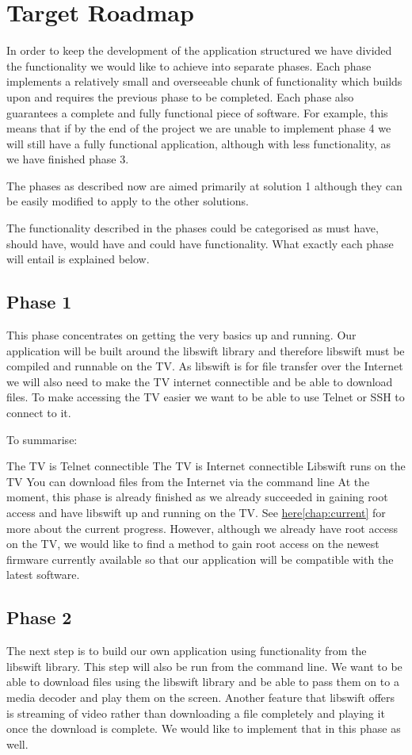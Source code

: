 \chapter*{Target Roadmap}

In order to keep the development of the application structured we have divided the functionality 
we would like to achieve into separate phases. 
Each phase implements a relatively small and overseeable chunk of functionality 
which builds upon and requires the previous phase to be completed. 
Each phase also guarantees a complete and fully functional piece of software. 
For example, this means that if by the end of the project we are unable to implement phase 4 we will 
still have a fully functional application, although with less functionality, as we have finished phase 3.

The phases as described now are aimed primarily at solution 1 although they can be easily modified to 
apply to the other solutions.

The functionality described in the phases could be categorised as must have, 
should have, would have and could have functionality. What exactly each phase will entail is explained below.

\section*{Phase 1}
This phase concentrates on getting the very basics up and running. 
Our application will be built around the libswift library and therefore 
libswift must be compiled and runnable on the TV. 
As libswift is for file transfer over the Internet we will also need to make the 
TV internet connectible and be able to download files. 
To make accessing the TV easier we want to be able to use Telnet or SSH to connect to it.

To summarise:

The TV is Telnet connectible
The TV is Internet connectible
Libswift runs on the TV
You can download files from the Internet via the command line
At the moment, this phase is already finished as we already succeeded in gaining root access and 
have libswift up and running on the TV. See \hyperref[chap:current]{here\ref*{chap:current}} for more about the current progress.
However, although we already have root access on the TV, 
we would like to find a method to gain root access on the newest firmware currently 
available so that our application will be compatible with the latest software. 

\section*{Phase 2}
The next step is to build our own application using functionality from the libswift library. 
This step will also be run from the command line. 
We want to be able to download files using the libswift library and 
be able to pass them on to a media decoder and play them on the screen. 
Another feature that libswift offers is streaming of video rather than 
downloading a file completely and playing it once the download is complete. 
We would like to implement that in this phase as well.

